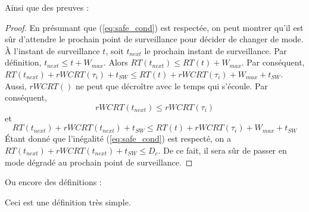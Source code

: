 \documentclass[french, a4paper, 11pt, twoside, pdftex]{StyleThese}
\begin{document}
Ainsi que des preuves :

    \begin{proof}
		En présumant que (\ref{eq:safe_cond}) est respectée, on peut montrer qu'il est sûr d'attendre le prochain point de surveillance pour décider de changer de mode. \nline
		À l'instant de surveillance $t$, soit $t_{next}$ le prochain instant de surveillance.\nline
		Par définition, $t_{next} \leq t + W_{max}$. Alors $RT(t_{next}) \leq RT(t) + W_{max}$.
		Par conséquent, \smallbreak
		$RT(t_{next}) + rWCRT(\tau_i) + t_{SW} \leq RT(t) + rWCRT(\tau_i) + W_{max} + t_{SW}$. \nline
		Aussi, $rWCRT()$ ne peut que décroître avec le temps qui s'écoule. Par conséquent, %
		\[ rWCRT(t_{next}) \leq rWCRT(\tau_i)	\]
		et
		\[ RT(t_{next}) + rWCRT(t_{next}) + t_{SW} \leq RT(t) + rWCRT(\tau_i) + W_{max} + t_{SW} \]
		Étant donné que l'inégalité (\ref{eq:safe_cond}) est respecté, on a $RT(t_{next}) + rWCRT(t_{next}) + t_{SW} \leq D_c$.
		De ce fait, il sera sûr de passer en mode dégradé au prochain point de surveillance.
    \end{proof}
    Ou encore des définitions :

    \begin{definition}
        Ceci est une définition très simple.
    \end{definition}




\ifdefined{}
\else


\end{document}
